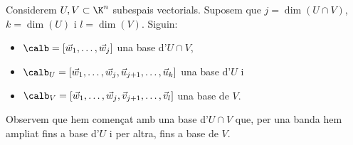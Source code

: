 \begin{observacio}
    Considerem $U,V\subset \K^n$ subespais vectorials. Suposem que $j=\dim(U\cap V)$, $k=\dim(U)$ i $l=\dim(V)$. Siguin:
    \begin{itemize}
        \item $\calb=[\vec w_1, \dots , \vec w_j]$  una base d'$U\cap V$,
        \item $\calb_U=[\vec w_1, \dots , \vec w_j,\vec u_{j+1}, \dots, \vec u_k]$  una base d'$U$ i
        \item $\calb_V=[\vec w_1, \dots , \vec w_j,\vec v_{j+1}, \dots, \vec v_l]$  una base de $V$.
    \end{itemize}
    Observem que hem començat amb una base d'$U\cap V$ que, per una banda hem ampliat fins a base d'$U$ i per altra, fins a base de $V$.
    

\end{observacio}
